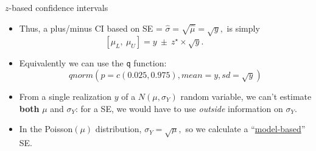 \documentclass[10pt]{beamer}\usepackage[]{graphicx}\usepackage[]{color}
\begin{document}
\begin{frame}{$z$-based confidence intervals}
	\begin{itemize}
		\setlength\itemsep{1.1em}
		\item Thus, a plus/minus CI based on SE = $\hat{\sigma} =  \sqrt{\hat{\mu}} = \sqrt{y},$   is simply
		$$[ \mu_{L}, \ \mu_{U}] = y  \ \pm \ z^\star \times \sqrt{y}. \ \ \ \ \ \ \ \ \ \ \ \  $$
		\item Equivalently we can use the \texttt{q} function: $$qnorm(p = c(0.025, 0.975), mean = y, sd = \sqrt{y})$$
		
		
		\vspace*{-0.7cm}
		
		\item From a single realization $y$ of a $N(\mu,\sigma_{Y})$ random variable, we can't estimate \textbf{both} $\mu$ and $\sigma_{Y}$: for a SE, we would have to use \textit{outside} information on $\sigma_{Y}$.  
		
		
		
		\item In the  Poisson$(\mu)$ distribution, $\sigma_{Y} = \sqrt{\mu},$ so we  calculate a ``\underline{model-based}'' SE.
		
		
	\end{itemize}
	
\end{frame}


\begin{frame}
\end{frame}
\end{document}
